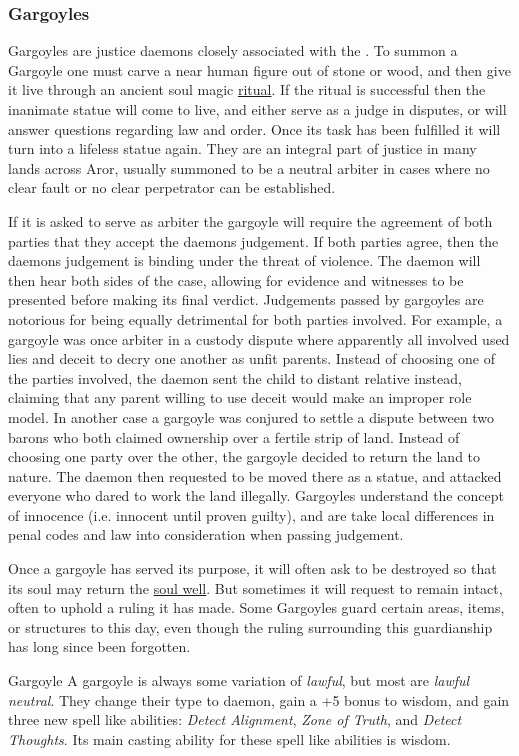 \subsubsection{Gargoyles}
\label{sec:Gargoyles}

Gargoyles are justice daemons closely associated with the .
To summon a Gargoyle one must carve a near human figure out of stone or wood,
and then give it live through an ancient soul magic
\hyperref[sec:Rituals]{ritual}. If the ritual is successful then the inanimate
statue will come to live, and either serve as a judge in disputes, or will
answer questions regarding law and order. Once its task has been fulfilled it
will turn into a lifeless statue again. They are an integral part of justice
in many lands across Aror, usually summoned to be a neutral arbiter in cases
where no clear fault or no clear perpetrator can be established.

If it is asked to serve as arbiter the gargoyle will require the agreement of
both parties that they accept the daemons judgement. If both parties agree,
then the daemons judgement is binding under the threat of violence. The daemon
will then hear both sides of the case, allowing for evidence and witnesses to
be presented before making its final verdict. Judgements passed by gargoyles
are notorious for being equally detrimental for both parties involved. For
example, a gargoyle was once arbiter in a custody dispute where apparently all
involved used lies and deceit to decry one another as unfit parents. Instead of
choosing one of the parties involved, the daemon sent the child to distant
relative instead, claiming that any parent willing to use deceit would make an
improper role model. In another case a gargoyle was conjured to settle a
dispute between two barons who both claimed ownership over a fertile strip of
land. Instead of choosing one party over the other, the gargoyle decided to
return the land to nature. The daemon then requested to be moved there as a
statue, and attacked everyone who dared to work the land illegally. Gargoyles
understand the concept of innocence (i.e. innocent until proven guilty), and
are take local differences in penal codes and law into consideration when
passing judgement.

Once a gargoyle has served its purpose, it will often ask to be destroyed so
that its soul may return the \hyperref[sec:Soul Well]{soul well}. But sometimes
it will request to remain intact, often to uphold a ruling it has made. Some
Gargoyles guard certain areas, items, or structures to this day, even though
the ruling surrounding this guardianship has long since been forgotten.

\begin{35e}{Gargoyle}
  A gargoyle is always some variation of \emph{lawful}, but most are
  \emph{lawful neutral}. They change their type to daemon, gain a +5 bonus to
  wisdom, and gain three new spell like abilities: \emph{Detect Alignment},
  \emph{Zone of Truth}, and \emph{Detect Thoughts}. Its main casting ability
  for these spell like abilities is wisdom.
\end{35e}
